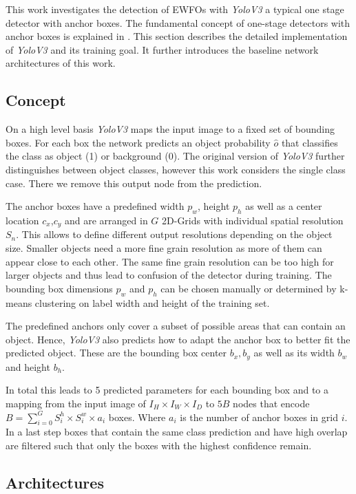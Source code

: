 This work investigates the detection of \acp{EWFO} with \textit{YoloV3} a typical one stage detector with anchor boxes. The fundamental concept of one-stage detectors with anchor boxes is explained in . This section describes the detailed implementation of \textit{YoloV3} and its training goal. It further introduces the baseline network architectures of this work.

\subsection{Concept}

On a high level basis \textit{YoloV3} maps the input image to a fixed set of bounding boxes. For each box the network predicts an object probability $\hat o$ that classifies the class as object (1) or background (0). The original version of \textit{YoloV3} further distinguishes between object classes, however this work considers the single class case. There we remove this output node from the prediction. 

The anchor boxes have a predefined width $p_w$, height $p_h$ as well as a center location $c_x$,$c_y$ and are arranged in $G$ 2D-Grids with individual spatial resolution $S_n$. This allows to define different output resolutions depending on the object size. Smaller objects need a more fine grain resolution as more of them can appear close to each other. The same fine grain resolution can be too high for larger objects and thus lead to confusion of the detector during training. The bounding box dimensions $p_w$ and $p_h$ can be chosen manually or determined by k-means clustering on label width and height of the training set.

The predefined anchors only cover a subset of possible areas that can contain an object. Hence, \textit{YoloV3} also predicts how to adapt the anchor box to better fit the predicted object. These are the bounding box center $b_x,b_y$ as well as its width $b_w$ and height $b_h$. 

In total this leads to 5 predicted parameters for each bounding box and to a mapping from the input image of $I_H\times I_W\times I_D$ to $5B$ nodes that encode $B=\sum_{i=0}^{G}S^h_i\times S^w_i\times a_i$ boxes. Where $a_i$ is the number of anchor boxes in grid $i$. In a last step boxes that contain the same class prediction and have high overlap are filtered such that only the boxes with the highest confidence remain.	

\subsection{Architectures}

